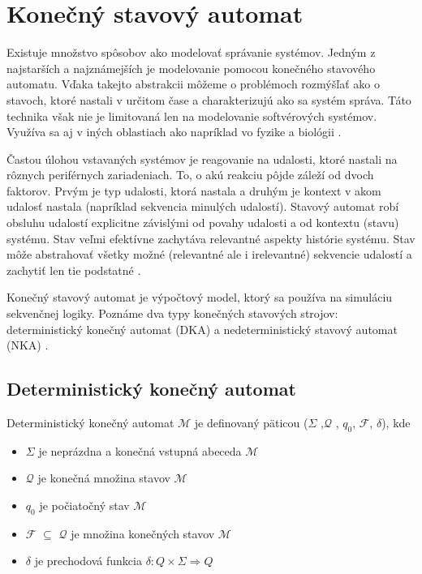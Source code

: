 \section{Konečný stavový automat} \label{state-machine-theory}
\noindent \par
Existuje množstvo spôsobov ako modelovať správanie systémov. Jedným z
najstarších a najznámejších je modelovanie pomocou konečného stavového automatu.
Vďaka takejto abstrakcii môžeme o problémoch rozmýšľať ako o stavoch, ktoré nastali v určitom čase a charakterizujú ako sa systém správa.
Táto technika však nie je limitovaná len na modelovanie softvérových systémov. Využíva sa aj v iných oblastiach ako napríklad vo fyzike a biológii \cite{WaybackMachine2014}.
\par Častou úlohou vstavaných systémov je reagovanie na udalosti, ktoré nastali  na rôznych
periférnych zariadeniach. To, o akú reakciu pôjde záleží od dvoch faktorov. Prvým je typ
udalosti, ktorá nastala a druhým je kontext v akom udalosť nastala
(napríklad sekvencia minulých udalostí). Stavový automat robí obsluhu udalostí explicitne závislými od povahy udalosti a od kontextu (stavu) systému.
Stav veľmi efektívne zachytáva relevantné aspekty histórie systému.
Stav môže abstrahovať všetky možné (relevantné ale i irelevantné) sekvencie udalostí a zachytiť len tie podstatné \cite{samekStateMachinesEventDriven2016}.
\par Konečný stavový automat je výpočtový model, ktorý sa používa na simuláciu sekvenčnej logiky.
Poznáme dva typy konečných stavových strojov: deterministický konečný automat (DKA)  a nedeterministický stavový automat (NKA) \cite{FiniteStateMachines}.

\subsection{Deterministický konečný automat}
\noindent \par
Deterministický konečný automat $\mathcal{M}$ je definovaný päticou ($\Sigma$ ,$\mathcal{Q}$ , $q_0$, $\mathcal{F}$, $\delta$), kde
\begin{itemize}
    \item $\Sigma$ je neprázdna a konečná vstupná abeceda $\mathcal{M}$
    \item $\mathcal{Q}$ je konečná množina stavov $\mathcal{M}$
    \item $q_0$ je počiatočný stav $\mathcal{M}$
    \item $\mathcal{F}$ $\subseteq$ $\mathcal{Q}$ je množina konečných stavov $\mathcal{M}$
    \item $\delta$ je prechodová funkcia  \begin{math}\delta : Q \times \Sigma \Rightarrow Q\end{math}
\end{itemize}

